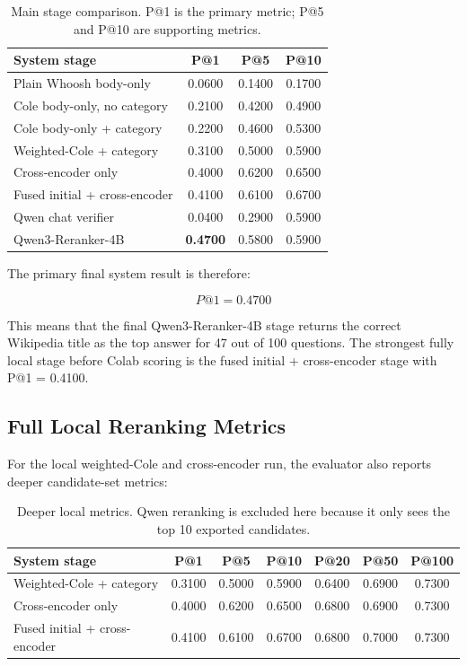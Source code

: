 \documentclass[11pt]{article}
\begin{document}
\begin{table}[h]
\centering
\small
\begin{tabular}{lccc}
\toprule
System stage & P@1 & P@5 & P@10 \\
\midrule
Plain Whoosh body-only & 0.0600 & 0.1400 & 0.1700 \\
Cole body-only, no category & 0.2100 & 0.4200 & 0.4900 \\
Cole body-only + category & 0.2200 & 0.4600 & 0.5300 \\
Weighted-Cole + category & 0.3100 & 0.5000 & 0.5900 \\
Cross-encoder only & 0.4000 & 0.6200 & 0.6500 \\
Fused initial + cross-encoder & 0.4100 & 0.6100 & 0.6700 \\
Qwen chat verifier & 0.0400 & 0.2900 & 0.5900 \\
Qwen3-Reranker-4B & \textbf{0.4700} & 0.5800 & 0.5900 \\
\bottomrule
\end{tabular}
\caption{Main stage comparison. P@1 is the primary metric; P@5 and P@10 are supporting metrics.}
\end{table}

The primary final system result is therefore:

\[
\boxed{P@1 = 0.4700}
\]

This means that the final Qwen3-Reranker-4B stage returns the correct Wikipedia title as the top answer for 47 out of 100 questions. The strongest fully local stage before Colab scoring is the fused initial + cross-encoder stage with P@1 = 0.4100.

\subsection{Full Local Reranking Metrics}

For the local weighted-Cole and cross-encoder run, the evaluator also reports deeper candidate-set metrics:

\begin{table}[h]
\centering
\small
\begin{tabular}{lcccccc}
\toprule
System stage & P@1 & P@5 & P@10 & P@20 & P@50 & P@100 \\
\midrule
Weighted-Cole + category & 0.3100 & 0.5000 & 0.5900 & 0.6400 & 0.6900 & 0.7300 \\
Cross-encoder only & 0.4000 & 0.6200 & 0.6500 & 0.6800 & 0.6900 & 0.7300 \\
Fused initial + cross-encoder & 0.4100 & 0.6100 & 0.6700 & 0.6800 & 0.7000 & 0.7300 \\
\bottomrule
\end{tabular}
\caption{Deeper local metrics. Qwen reranking is excluded here because it only sees the top 10 exported candidates.}
\end{table}
\end{document}
